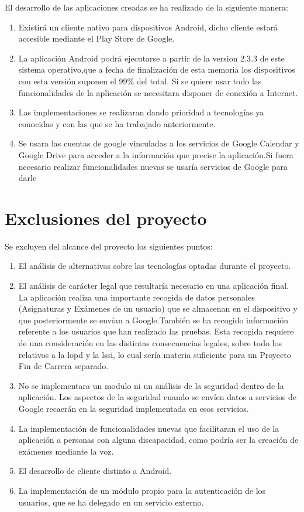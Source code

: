 El desarrollo de las aplicaciones creadas se ha realizado de la siguiente manera:

\begin{enumerate}
	\item Existirá un cliente nativo para dispositivos Android, dicho cliente estará accesible mediante el Play Store de Google.
	\item La aplicación Android podrá ejecutarse a partir de la version 2.3.3 de este sistema operativo,que a fecha de finalización de esta memoria los dispositivos con esta versión suponen el 99\% del total. Si se quiere usar todo las funcionalidades de la aplicación se necesitara disponer de conexión a Internet.
	\item Las implementaciones se realizaran dando prioridad a tecnologías ya conocidas y con las que se ha trabajado anteriormente.
	\item Se usara las cuentas de google vinculadas a los servicios de Google Calendar y Google Drive para acceder a la información que precise la aplicación.Si fuera necesario realizar funcionalidades nuevas se usaría servicios de Google para darle  
\end{enumerate}
\newpage
\section{Exclusiones del proyecto}
\label{secc:Exclusiones}

Se excluyen del alcance del proyecto los siguientes puntos:

\begin{enumerate}
	\item El análisis de alternativas sobre las tecnologías optadas durante el proyecto. 
	\item El análisis de carácter legal que resultaría necesario en una aplicación final. La aplicación realiza una importante recogida de datos personales (Asignaturas y Exámenes de un usuario) que se almacenan en el dispositivo y que posteriormente se envían a Google.También se ha recogido información referente a los usuarios que han realizado las pruebas. Esta recogida requiere de una consideración en las distintas consecuencias legales, sobre todo los relativos a la \acrfull{lopd} y la \acrfull{lssi}, lo cual sería materia suficiente para un Proyecto Fin de Carrera separado.
	\item No se implementara un modulo ni un análisis de la seguridad dentro de la aplicación. Los aspectos de la seguridad cuando se envíen datos a servicios de Google recaerán en la seguridad implementada en esos servicios.
	\item La implementación de funcionalidades nuevas que facilitaran el uso de la aplicación a personas con alguna discapacidad, como podría ser la creación de exámenes mediante la voz. 
	\item El desarrollo de cliente distinto a Android.
	\item La implementación de un módulo propio para la autenticación de los usuarios, que se ha delegado en un servicio externo.
\end{enumerate}

